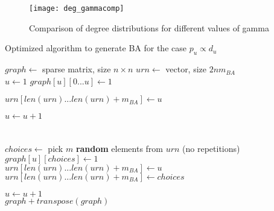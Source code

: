 \begin{figure} [!ht]
	\centering
	\texttt{[image: deg\_gammacomp]}
	\caption{Comparison of degree distributions for different values of gamma}
	\label{fig:deg4_gammacomp}
\end{figure}

\pagebreak
 
\begin{algorithm}
	\caption{Optimized algorithm to generate BA for the case $p_u \propto d_u$}
	\label{algo:ba_opt}
\begin{algorithmic}[1]
		
		\State $graph \gets$ sparse matrix, size $n\times n$
		\State $urn \gets$ vector, size $2 n m_{BA}$
		\\
		\State $u \gets 1$
		 
		\State $graph[u][0...u] \gets 1$
		
		\State $urn[len(urn) ... len(urn)+m_{BA}] \gets u$
		
		\State $u \gets u+1$
		\EndWhile
		\\
		\\
		 
		\\
			\State $choices \gets $ pick $m$ \textbf{random} elements from $ urn $ (no repetitions)
			\\
			\State $graph[u][choices] \gets 1$ 
			\\
			\State $urn[len(urn) ... len(urn)+m_{BA}] \gets u$
			\State $urn[len(urn) ... len(urn)+m_{BA}] \gets choices$

		
		\State $u \gets u+1$
		\EndWhile
		\\	
		\State \Return $graph+transpose(graph)$
		\EndFunction
\end{algorithmic}
\end{algorithm}

